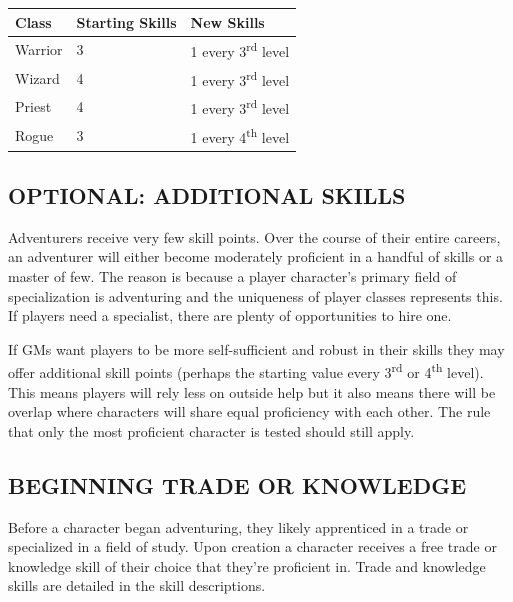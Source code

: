 \begin{multicols}{2}
\noindent
\begin{minipage}{\columnwidth}

\label{classNCSP}
\noindent
\begin{tabular}{|m{}|m{}|m{}|}
\hline
Class	& Starting Skills		& New Skills \\
\hline\hline
\rowcolor[gray]{.9}Warrior	& 3	& 1 every 3\textsuperscript{rd} level \\
Wizard	& 4	& 1 every 3\textsuperscript{rd} level \\
\rowcolor[gray]{.9}Priest	& 4	& 1 every 3\textsuperscript{rd} level \\
Rogue	& 3	& 1 every 4\textsuperscript{th} level \\
\hline
\end{tabular}

\end{minipage}

\subsection{OPTIONAL: ADDITIONAL SKILLS}

Adventurers receive very few skill points.  Over the course of their entire careers, an adventurer will either become moderately proficient in a handful of skills or a master of few.  The reason is because a player character's primary field of specialization is adventuring and the uniqueness of player classes represents this.  If players need a specialist, there are plenty of opportunities to hire one.

If GMs want players to be more self-sufficient and robust in their skills they may offer additional skill points (perhaps the starting value every 3\textsuperscript{rd} or 4\textsuperscript{th} level).  This means players will rely less on outside help but it also means there will be overlap where characters will share equal proficiency with each other.  The rule that only the most proficient character is tested should still apply.  

\subsection{BEGINNING TRADE OR KNOWLEDGE}

Before a character began adventuring, they likely apprenticed in a trade or specialized in a field of study.  Upon creation a character receives a free trade or knowledge skill of their choice that they're proficient in.  Trade and knowledge skills are detailed in the skill descriptions.


\end{multicols}
